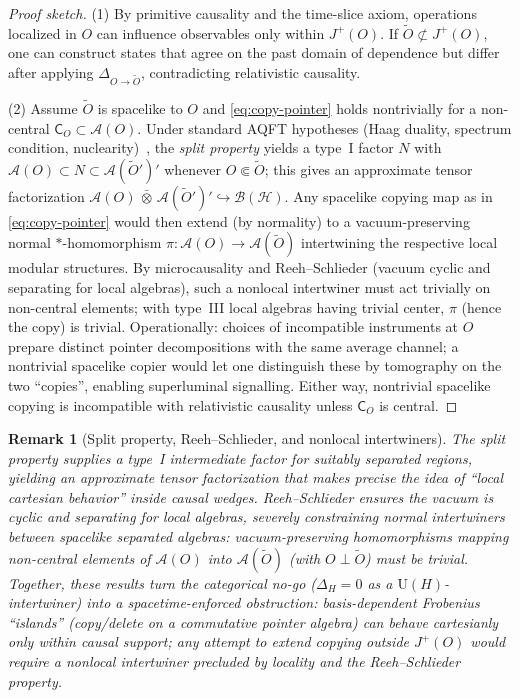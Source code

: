 \documentclass[11pt]{article}
\theoremstyle{upright}
\newtheorem{remark}{Remark}
\begin{document}
\begin{proof}[Proof sketch]
(1) By primitive causality and the time-slice axiom, operations localized in $O$ can influence observables only within $J^+(O)$. If $\tilde O\not\subset J^+(O)$, one can construct states that agree on the past domain of dependence but differ after applying $\Delta_{O\to\tilde O}$, contradicting relativistic causality.

(2) Assume $\tilde O$ is spacelike to $O$ and \eqref{eq:copy-pointer} holds nontrivially for a non-central $\mathsf{C}_O\subset\mathcal{A}(O)$. Under standard AQFT hypotheses (Haag duality, spectrum condition, nuclearity)~\cite{BuchholzWichmann1986,DoplicherLongo1984}, the \emph{split property} yields a type~I factor $N$ with $\mathcal{A}(O)\subset N \subset \mathcal{A}(\tilde O')'$ whenever $O\Subset\tilde O$; this gives an approximate tensor factorization $\mathcal{A}(O)\,\bar\otimes\,\mathcal{A}(\tilde O')'\hookrightarrow\mathcal{B}(\mathcal{H})$. Any spacelike copying map as in \eqref{eq:copy-pointer} would then extend (by normality) to a vacuum-preserving normal $*$-homomorphism $\pi:\mathcal{A}(O)\to\mathcal{A}(\tilde O)$ intertwining the respective local modular structures. By microcausality and Reeh--Schlieder (vacuum cyclic and separating for local algebras), such a nonlocal intertwiner must act trivially on non-central elements; with type~III local algebras having trivial center, $\pi$ (hence the copy) is trivial. Operationally: choices of incompatible instruments at $O$ prepare distinct pointer decompositions with the same average channel; a nontrivial spacelike copier would let one distinguish these by tomography on the two ``copies'', enabling superluminal signalling. Either way, nontrivial spacelike copying is incompatible with relativistic causality unless $\mathsf{C}_O$ is central.
\end{proof}

\begin{remark}[Split property, Reeh--Schlieder, and nonlocal intertwiners]
\label{rem:split-reeh}
The split property \cite{BuchholzWichmann1986,DoplicherLongo1984} supplies a type~I intermediate factor for suitably separated regions, yielding an approximate tensor factorization that makes precise the idea of ``local cartesian behavior'' inside causal wedges. Reeh--Schlieder \cite{ReehSchlieder1961,Haag1992} ensures the vacuum is cyclic and separating for local algebras, severely constraining normal intertwiners between spacelike separated algebras: vacuum-preserving homomorphisms mapping non-central elements of $\mathcal{A}(O)$ into $\mathcal{A}(\tilde O)$ (with $O\perp \tilde O$) must be trivial. Together, these results turn the categorical no-go ($\Delta_H=0$ as a $\mathrm{U}(H)$-intertwiner) into a spacetime-enforced obstruction: basis-dependent Frobenius ``islands'' (copy/delete on a commutative pointer algebra) can behave cartesianly only \emph{within} causal support; any attempt to extend copying outside $J^+(O)$ would require a nonlocal intertwiner precluded by locality and the Reeh--Schlieder property.
\end{remark}
\end{document}
